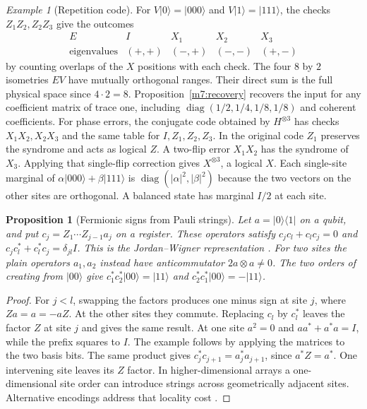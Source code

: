 \documentclass[11pt,reqno]{amsart}
\newtheorem{proposition}[theorem]{Proposition}
\theoremstyle{definition}
\theoremstyle{remark}
\newtheorem{example}[theorem]{Example}
\numberwithin{equation}{section}
\begin{document}
\begin{example}[Repetition code]\label{m7:repetition}
For $V\lvert0\rangle=\lvert000\rangle$ and
$V\lvert1\rangle=\lvert111\rangle$, the checks $Z_1Z_2,Z_2Z_3$
give the outcomes
\[
\begin{array}{c|cccc}
 E&I&X_1&X_2&X_3\\ \hline
 \text{eigenvalues}&(+,+)&(-,+)&(-,-)&(+,-)
\end{array}
\]
by counting overlaps of the $X$ positions with each check.
The four $8$ by $2$ isometries $EV$ have mutually orthogonal
ranges. Their direct sum is the full physical space since
$4\cdot2=8$. Proposition~\ref{m7:recovery} recovers the input
for any coefficient matrix of trace one, including
$\operatorname{diag}(1/2,1/4,1/8,1/8)$ and coherent coefficients.
For phase errors, the conjugate code obtained by $H^{\otimes3}$
has checks $X_1X_2,X_2X_3$ and the same table for $I,Z_1,Z_2,Z_3$.
In the original code $Z_1$ preserves the syndrome and acts as
logical $Z$. A two-flip error $X_1X_2$ has the syndrome of $X_3$.
Applying that single-flip correction gives $X^{\otimes3}$, a
logical $X$. Each single-site marginal of
$\alpha\lvert000\rangle+\beta\lvert111\rangle$ is
$\operatorname{diag}(|\alpha|^2,|\beta|^2)$ because the
two vectors on the other sites are orthogonal. A balanced
state has marginal $I/2$ at each site.
\end{example}

\begin{proposition}[Fermionic signs from Pauli strings]\label{m7:jw}
Let $a=\lvert0\rangle\langle1\rvert$ on a qubit, and put
$c_j=Z_1\cdots Z_{j-1}a_j$ on a register.
These operators satisfy
$c_j c_l+c_l c_j=0$ and
$c_j c_l^*+c_l^*c_j=\delta_{jl}I$.
This is the Jordan--Wigner representation \cite{m7:JW}.
For two sites the plain operators $a_1,a_2$ instead have
anticommutator $2a\otimes a\ne0$. The two orders of creating from
$\lvert00\rangle$ give
$c_1^*c_2^*\lvert00\rangle=\lvert11\rangle$ and
$c_2^*c_1^*\lvert00\rangle=-\lvert11\rangle$.
\end{proposition}
\begin{proof}
For $j<l$, swapping the factors produces one minus sign at
site $j$, where $Za=a=-aZ$. At the other sites they commute.
Replacing $c_l$ by $c_l^*$ leaves the factor $Z$ at site $j$
and gives the same result. At one site $a^2=0$ and
$aa^*+a^*a=I$, while the prefix squares to $I$.
The example follows by applying the matrices to the two basis bits.
The same product gives $c_j^*c_{j+1}=a_j^*a_{j+1}$, since
$a^*Z=a^*$. One intervening site leaves its $Z$ factor.
In higher-dimensional arrays a one-dimensional site order can
introduce strings across geometrically adjacent sites. Alternative
encodings address that locality cost
\cite{m7:BravyiKitaev,m7:VerstraeteCirac}.
\end{proof}
\end{document}
